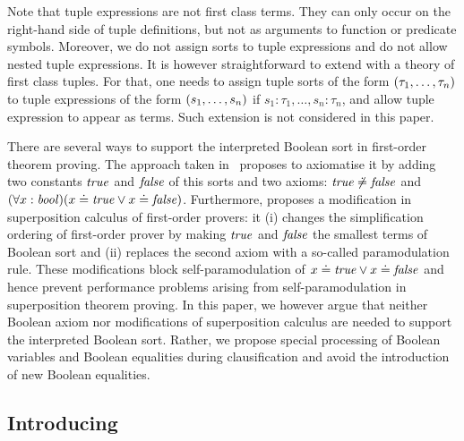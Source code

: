 Note that tuple expressions are not first class terms. They can only occur on the right-hand side of tuple definitions, but not as arguments to function or predicate symbols. Moreover, we do not assign sorts to tuple expressions and do not allow nested tuple expressions. It is however straightforward to extend \folb{} with a theory of first class tuples. For that, one needs to assign tuple sorts of the form $({\tau_1,\ldots,\tau_n})$ to tuple expressions of the form $({s_1,\ldots,s_n})$ if $s_1:\tau_1,\ldots,s_n:\tau_n$, and allow tuple expression to appear as terms. Such extension is not considered in this paper.

There are several ways to support the interpreted Boolean sort in first-order theorem proving. 
The approach taken in~\cite{FOOL} proposes to axiomatise it by adding two constants $\mathit{true}$ and $\mathit{false}$ of this sorts and two axioms: $\mathit{true} \not\doteq \mathit{false}$ and $(\forall x:\mathit{bool})(x \doteq \mathit{true} \lor x \doteq \mathit{false})$. Furthermore, \cite{FOOL} proposes a modification in superposition calculus of first-order provers: it (i)
changes the  simplification ordering of first-order prover by making $\mathit{true}$ and $\mathit{false}$ the smallest terms of Boolean sort 
and (ii) replaces the second axiom with a so-called \folb{} paramodulation rule. These modifications block self-paramodulation of $x \doteq \mathit{true} \lor x \doteq \mathit{false}$ and hence prevent performance problems arising from self-paramodulation in superposition theorem proving. 
In this paper, we however argue that neither Boolean axiom nor modifications of superposition calculus are needed to support the interpreted Boolean sort. 
Rather, we propose special processing of Boolean variables and Boolean equalities during clausification and avoid the introduction of new Boolean equalities. 

\subsection{Introducing \nfcnf{}}

